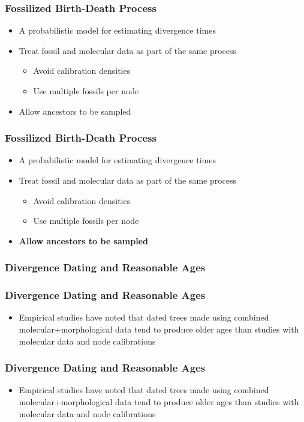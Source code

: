 \documentclass[]{beamer}
\begin{document}
\begin{frame}
\frametitle{Fossilized Birth-Death Process}
\begin{itemize}
\item A probabilistic model for estimating divergence times
\item Treat fossil and molecular data as part of the same process 
\begin{itemize}
	\item Avoid calibration densities 
	\item Use multiple fossils per node
\end{itemize}
\item Allow ancestors to be sampled 	
\end{itemize}
\end{frame}

\begin{frame}
\frametitle{Fossilized Birth-Death Process}
\begin{itemize}
\item A probabilistic model for estimating divergence times
\item Treat fossil and molecular data as part of the same process 
\begin{itemize}
	\item Avoid calibration densities 
	\item Use multiple fossils per node
\end{itemize}
\item \textbf{Allow ancestors to be sampled}	
\end{itemize}
\end{frame}

\begin{frame}
\frametitle{Divergence Dating and Reasonable Ages}
\end{frame}

\begin{frame}
\frametitle{Divergence Dating and Reasonable Ages}
\begin{itemize}
\item Empirical studies have noted that dated trees made using combined molecular+morphological data tend to produce older ages than studies with molecular data and node calibrations
\end{itemize}
\end{frame}

\begin{frame}
\frametitle{Divergence Dating and Reasonable Ages}
\begin{itemize}
\item Empirical studies have noted that dated trees made using combined molecular+morphological data tend to produce older ages than studies with molecular data and node calibrations
\end{itemize}
\end{frame}
\end{document}
